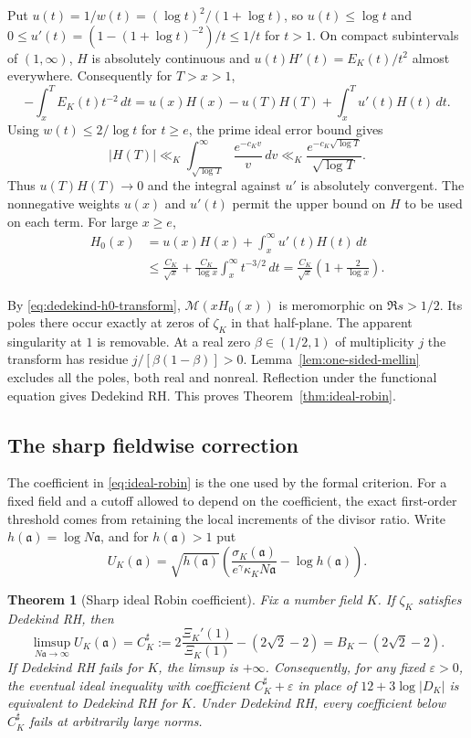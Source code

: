 \documentclass[11pt]{amsart}
\newtheorem{theorem}{Theorem}[section]
\theoremstyle{definition}
\theoremstyle{remark}
\numberwithin{equation}{section}
\begin{document}
Put \(u(t)=1/w(t)=(\log t)^2/(1+\log t)\), so \(u(t)\leq\log t\)
and \(0\leq u'(t)=(1-(1+\log t)^{-2})/t\leq1/t\) for \(t>1\).
On compact subintervals of \((1,\infty)\), \(H\) is absolutely
continuous and \(u(t)H'(t)=E_K(t)/t^2\) almost everywhere.
Consequently for \(T>x>1\),
\[
 -\int_x^T E_K(t)t^{-2}\,dt
 =u(x)H(x)-u(T)H(T)+\int_x^T u'(t)H(t)\,dt.
\]
Using \(w(t)\leq2/\log t\) for \(t\geq e\), the prime ideal error
bound gives
\[
 |H(T)|\ll_K
 \int_{\sqrt{\log T}}^\infty \frac{e^{-c_K v}}{v}\,dv
 \ll_K \frac{e^{-c_K\sqrt{\log T}}}{\sqrt{\log T}} .
\]
Thus \(u(T)H(T)\to0\) and the integral against \(u'\) is absolutely
convergent. The nonnegative weights \(u(x)\) and \(u'(t)\) permit
the upper bound on \(H\) to be used on each term. For large \(x\geq e\),
\begin{align*}
 H_0(x)
 &=u(x)H(x)+\int_x^\infty u'(t)H(t)\,dt\\
 &\leq\frac{C_K}{\sqrt{x}}
      +\frac{C_K}{\log x}\int_x^\infty t^{-3/2}\,dt
  =\frac{C_K}{\sqrt{x}}\left(1+\frac{2}{\log x}\right).
\end{align*}

By \eqref{eq:dedekind-h0-transform},
\(\mathcal{M}(xH_0(x))\) is meromorphic on \(\Re s>1/2\).
Its poles there occur exactly at zeros of \(\zeta_K\) in that
half-plane. The apparent singularity at \(1\) is removable.
At a real zero \(\beta\in(1/2,1)\) of multiplicity \(j\) the
transform has residue \(j/[\beta(1-\beta)]>0\).
Lemma~\ref{lem:one-sided-mellin} excludes all the poles, both real
and nonreal. Reflection under the functional equation gives Dedekind
RH. This proves Theorem~\ref{thm:ideal-robin}.

\subsection{The sharp fieldwise correction}\label{sec:ideal-sharp}

The coefficient in \eqref{eq:ideal-robin} is the one used by
the formal criterion. For a fixed field and a cutoff allowed
to depend on the coefficient, the exact first-order threshold
comes from retaining the local increments of the divisor ratio.
Write \(h(\mathfrak a)=\log N\mathfrak a\), and for
\(h(\mathfrak a)>1\) put
\[
 U_K(\mathfrak a)=\sqrt{h(\mathfrak a)}
 \left(\frac{\sigma_K(\mathfrak a)}
 {e^\gamma\kappa_K N\mathfrak a}-\log h(\mathfrak a)\right).
\]

\begin{theorem}[Sharp ideal Robin coefficient]\label{thm:ideal-sharp}
Fix a number field \(K\). If \(\zeta_K\) satisfies Dedekind RH, then
\begin{equation}\label{eq:ideal-sharp}
 \limsup_{N\mathfrak a\to\infty}U_K(\mathfrak a)
   = C_K^\sharp
   :=2\frac{\Xi_K'(1)}{\Xi_K(1)}-(2\sqrt2-2)
   = B_K-(2\sqrt2-2).
\end{equation}
If Dedekind RH fails for \(K\), the limsup is \(+\infty\).
Consequently, for any fixed \(\varepsilon>0\), the eventual ideal
inequality with coefficient \(C_K^\sharp+\varepsilon\) in
place of \(12+3\log|D_K|\) is equivalent to Dedekind RH for
\(K\). Under Dedekind RH, every coefficient below \(C_K^\sharp\)
fails at arbitrarily large norms.
\end{theorem}
\end{document}
